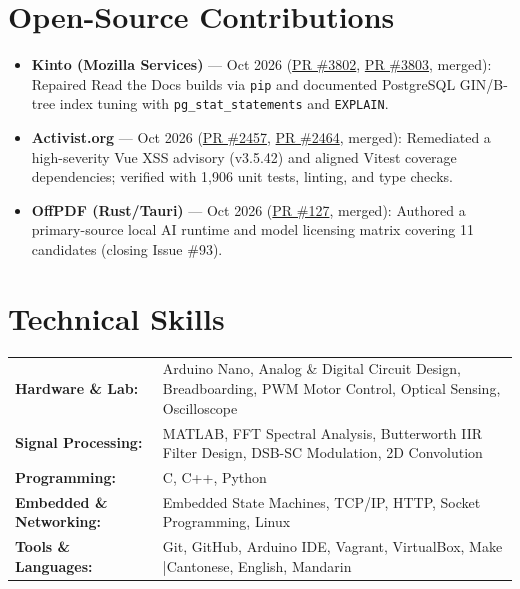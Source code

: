 \documentclass[10pt,a4paper]{article}
\begin{document}
\section{Open-Source Contributions}
\begin{itemize}
  \item \textbf{Kinto (Mozilla Services)} --- Oct 2026 (\href{https://github.com/Kinto/kinto/pull/3802}{PR \#3802}, \href{https://github.com/Kinto/kinto/pull/3803}{PR \#3803}, merged): Repaired Read the Docs builds via \texttt{pip} and documented PostgreSQL GIN/B-tree index tuning with \texttt{pg\_stat\_statements} and \texttt{EXPLAIN}.
  \item \textbf{Activist.org} --- Oct 2026 (\href{https://github.com/activist-org/activist/pull/2457}{PR \#2457}, \href{https://github.com/activist-org/activist/pull/2464}{PR \#2464}, merged): Remediated a high-severity Vue XSS advisory (v3.5.42) and aligned Vitest coverage dependencies; verified with 1,906 unit tests, linting, and type checks.
  \item \textbf{OffPDF (Rust/Tauri)} --- Oct 2026 (\href{https://github.com/McanKul/offpdf/pull/127}{PR \#127}, merged): Authored a primary-source local AI runtime and model licensing matrix covering 11 candidates (closing Issue \#93).
\end{itemize}

\section{Technical Skills}
\begin{tabularx}{\textwidth}{@{}l X@{}}
  \textbf{Hardware \& Lab:} & Arduino Nano, Analog \& Digital Circuit Design, Breadboarding, PWM Motor Control, Optical Sensing, Oscilloscope \\
  \textbf{Signal Processing:} & MATLAB, FFT Spectral Analysis, Butterworth IIR Filter Design, DSB-SC Modulation, 2D Convolution \\
  \textbf{Programming:} & C, C++, Python \\
  \textbf{Embedded \& Networking:} & Embedded State Machines, TCP/IP, HTTP, Socket Programming, Linux \\
  \textbf{Tools \& Languages:} & Git, GitHub, Arduino IDE, Vagrant, VirtualBox, Make \enspace|\enspace Cantonese, English, Mandarin \\
\end{tabularx}
\end{document}

